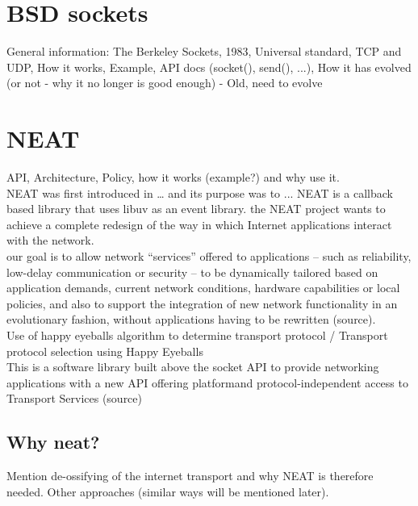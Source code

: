 \documentclass[12pt]{report}
\begin{document}
\section{BSD sockets}
General information: 
The Berkeley Sockets,
1983,
Universal standard,
TCP and UDP,
How it works,
Example, 
API docs (socket(), send(), ...),
How it has evolved (or not - why it no longer is good enough) - Old, need to evolve

\section{NEAT}
API, Architecture, Policy, how it works (example?) and why use it. \\
NEAT was first introduced in … and its purpose was to ... 
NEAT is a callback based library that uses libuv as an event library. 
the NEAT project wants to achieve a complete redesign of the way in which Internet applications interact with the network.\\
our goal is to allow network “services” offered to applications – such as reliability, low-delay communication or security – to be dynamically tailored based on application demands, current network conditions, hardware capabilities or local policies, and also to support the integration of new network functionality in an evolutionary fashion, without applications having to be rewritten (source). \\
Use of happy eyeballs algorithm to determine transport protocol /
Transport protocol selection using Happy Eyeballs \\
This is a software library built above the socket API to provide networking applications with a new API offering platformand protocol-independent access to Transport Services (source)


\subsection{Why neat?}
Mention de-ossifying of the internet transport and why NEAT is therefore needed. Other approaches  (similar ways will be mentioned later).
\end{document}
